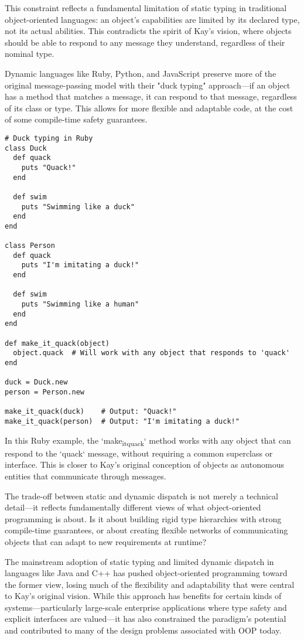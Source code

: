 \documentclass[11pt]{article}
\begin{document}
This constraint reflects a fundamental limitation of static typing in traditional object-oriented languages: an object's capabilities are limited by its declared type, not its actual abilities. This contradicts the spirit of Kay's vision, where objects should be able to respond to any message they understand, regardless of their nominal type.

Dynamic languages like Ruby, Python, and JavaScript preserve more of the original message-passing model with their "duck typing" approach—if an object has a method that matches a message, it can respond to that message, regardless of its class or type. This allows for more flexible and adaptable code, at the cost of some compile-time safety guarantees.

\begin{verbatim}
# Duck typing in Ruby
class Duck
  def quack
    puts "Quack!"
  end

  def swim
    puts "Swimming like a duck"
  end
end

class Person
  def quack
    puts "I'm imitating a duck!"
  end

  def swim
    puts "Swimming like a human"
  end
end

def make_it_quack(object)
  object.quack  # Will work with any object that responds to 'quack'
end

duck = Duck.new
person = Person.new

make_it_quack(duck)    # Output: "Quack!"
make_it_quack(person)  # Output: "I'm imitating a duck!"
\end{verbatim}

In this Ruby example, the `make\textsubscript{it}\textsubscript{quack}` method works with any object that can respond to the `quack` message, without requiring a common superclass or interface. This is closer to Kay's original conception of objects as autonomous entities that communicate through messages.

The trade-off between static and dynamic dispatch is not merely a technical detail—it reflects fundamentally different views of what object-oriented programming is about. Is it about building rigid type hierarchies with strong compile-time guarantees, or about creating flexible networks of communicating objects that can adapt to new requirements at runtime?

The mainstream adoption of static typing and limited dynamic dispatch in languages like Java and C++ has pushed object-oriented programming toward the former view, losing much of the flexibility and adaptability that were central to Kay's original vision. While this approach has benefits for certain kinds of systems—particularly large-scale enterprise applications where type safety and explicit interfaces are valued—it has also constrained the paradigm's potential and contributed to many of the design problems associated with OOP today.
\end{document}
